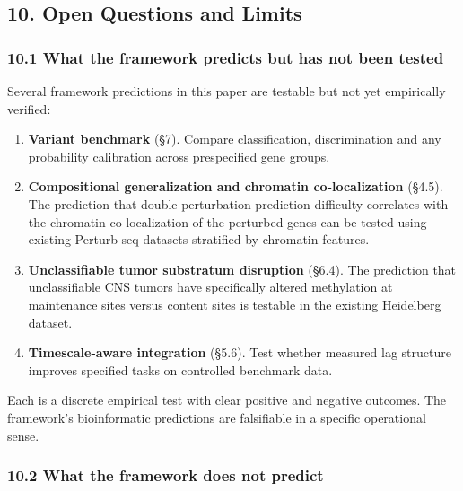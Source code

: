 \documentclass[
]{article}
\begin{document}
\hypertarget{open-questions-and-limits}{%
\subsection{10. Open Questions and
Limits}\label{open-questions-and-limits}}

\hypertarget{what-the-framework-predicts-but-has-not-been-tested}{%
\subsubsection{10.1 What the framework predicts but has not been
tested}\label{what-the-framework-predicts-but-has-not-been-tested}}

Several framework predictions in this paper are testable but not yet
empirically verified:

\begin{enumerate}
\def\labelenumi{(\roman{enumi})}
\item
  \textbf{Variant benchmark} (§7). Compare classification,
  discrimination and any probability calibration across prespecified
  gene groups.
\item
  \textbf{Compositional generalization and chromatin co-localization}
  (§4.5). The prediction that double-perturbation prediction difficulty
  correlates with the chromatin co-localization of the perturbed genes
  can be tested using existing Perturb-seq datasets stratified by
  chromatin features.
\item
  \textbf{Unclassifiable tumor substratum disruption} (§6.4). The
  prediction that unclassifiable CNS tumors have specifically altered
  methylation at maintenance sites versus content sites is testable in
  the existing Heidelberg dataset.
\item
  \textbf{Timescale-aware integration} (§5.6). Test whether measured lag
  structure improves specified tasks on controlled benchmark data.
\end{enumerate}

Each is a discrete empirical test with clear positive and negative
outcomes. The framework's bioinformatic predictions are falsifiable in a
specific operational sense.

\hypertarget{what-the-framework-does-not-predict}{%
\subsubsection{10.2 What the framework does not
predict}\label{what-the-framework-does-not-predict}}
\end{document}
